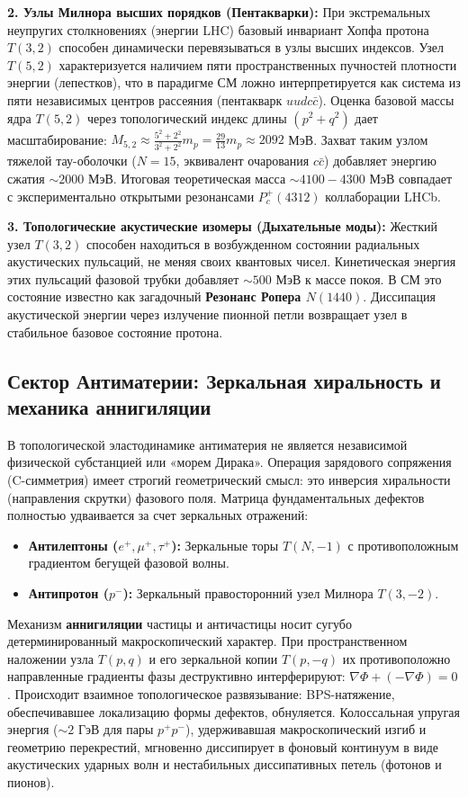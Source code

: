 \documentclass[11pt,a4paper]{article}
\begin{document}
	\textbf{2. Узлы Милнора высших порядков (Пентакварки):}
	При экстремальных неупругих столкновениях (энергии LHC) базовый инвариант Хопфа протона $T(3,2)$ способен динамически перевязываться в узлы высших индексов. Узел $T(5,2)$ характеризуется наличием пяти пространственных пучностей плотности энергии (лепестков), что в парадигме СМ ложно интерпретируется как система из пяти независимых центров рассеяния (пентакварк $uudc\bar{c}$). 
	Оценка базовой массы ядра $T(5,2)$ через топологический индекс длины $(p^2+q^2)$ дает масштабирование: $M_{5,2} \approx \frac{5^2+2^2}{3^2+2^2} m_p = \frac{29}{13} m_p \approx 2092$ МэВ. Захват таким узлом тяжелой тау-оболочки ($N=15$, эквивалент очарования $c\bar{c}$) добавляет энергию сжатия $\sim 2000$ МэВ. Итоговая теоретическая масса $\sim 4100-4300$ МэВ совпадает с экспериментально открытыми резонансами $P_c^+(4312)$ коллаборации LHCb.
	
	\textbf{3. Топологические акустические изомеры (Дыхательные моды):}
	Жесткий узел $T(3,2)$ способен находиться в возбужденном состоянии радиальных акустических пульсаций, не меняя своих квантовых чисел. Кинетическая энергия этих пульсаций фазовой трубки добавляет $\sim 500$ МэВ к массе покоя. В СМ это состояние известно как загадочный \textbf{Резонанс Ропера $N(1440)$}. Диссипация акустической энергии через излучение пионной петли возвращает узел в стабильное базовое состояние протона.
	
	\subsection{Сектор Антиматерии: Зеркальная хиральность и механика аннигиляции}
	В топологической эластодинамике антиматерия не является независимой физической субстанцией или «морем Дирака». Операция зарядового сопряжения (C-симметрия) имеет строгий геометрический смысл: это инверсия хиральности (направления скрутки) фазового поля. Матрица фундаментальных дефектов полностью удваивается за счет зеркальных отражений:
	\begin{itemize}
		\item \textbf{Антилептоны ($e^+, \mu^+, \tau^+$):} Зеркальные торы $T(N, -1)$ с противоположным градиентом бегущей фазовой волны.
		\item \textbf{Антипротон ($p^-$):} Зеркальный правосторонний узел Милнора $T(3, -2)$.
	\end{itemize}
	
	Механизм \textbf{аннигиляции} частицы и античастицы носит сугубо детерминированный макроскопический характер. При пространственном наложении узла $T(p,q)$ и его зеркальной копии $T(p,-q)$ их противоположно направленные градиенты фазы деструктивно интерферируют: $\nabla \Phi + (-\nabla \Phi) = 0$. Происходит взаимное топологическое развязывание: BPS-натяжение, обеспечивавшее локализацию формы дефектов, обнуляется. Колоссальная упругая энергия ($\sim 2$ ГэВ для пары $p^+p^-$), удерживавшая макроскопический изгиб и геометрию перекрестий, мгновенно диссипирует в фоновый континуум в виде акустических ударных волн и нестабильных диссипативных петель (фотонов и пионов). 
	
\end{document}
